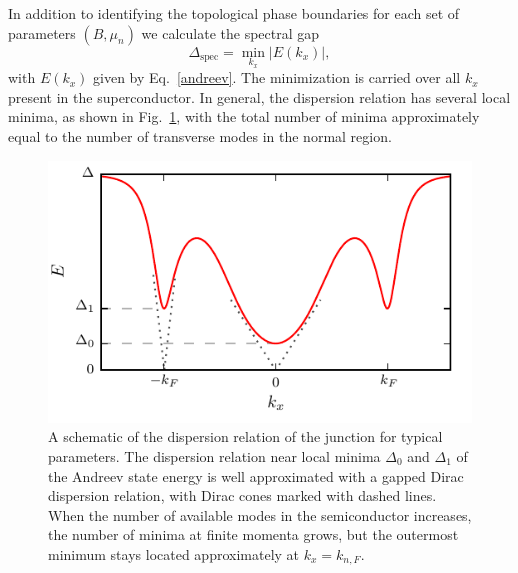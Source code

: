 In addition to identifying the topological phase boundaries for each set of parameters $(B, \mu_n)$ we calculate the spectral gap
\begin{equation}\label{specgap}
\Delta_\mathrm{spec}=\min_{k_x}|E(k_x)|,
\end{equation}
with $E(k_x)$ given by Eq.~\eqref{andreev}. The minimization is carried over all $k_x$ present in the superconductor.
In general, the dispersion relation has several local minima, as shown in Fig.~\ref{fig:dispersion}, with the total number of minima approximately equal to the number of transverse modes in the normal region.

\begin{figure}[tb]
\centering
\includegraphics[width=\linewidth]{chapter_shortjunction/figures/dispersion}
\caption{A schematic of the dispersion relation of the junction for typical parameters.
The dispersion relation near local minima $\Delta_0$ and $\Delta_1$ of the Andreev state energy is well approximated with a gapped Dirac dispersion relation, with Dirac cones marked with dashed lines.
When the number of available modes in the semiconductor increases, the number of minima at finite momenta grows, but the outermost minimum stays located approximately at $k_x = k_{n,F}$.}
\label{fig:dispersion}
\end{figure}

